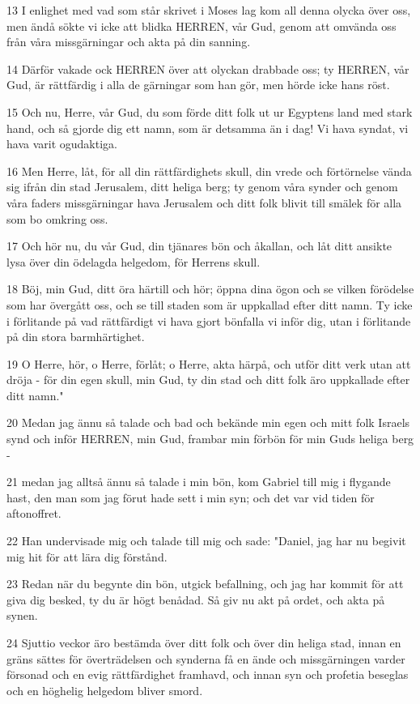 \par 13 I enlighet med vad som står skrivet i Moses lag kom all denna olycka över oss, men ändå sökte vi icke att blidka HERREN, vår Gud, genom att omvända oss från våra missgärningar och akta på din sanning.
\par 14 Därför vakade ock HERREN över att olyckan drabbade oss; ty HERREN, vår Gud, är rättfärdig i alla de gärningar som han gör, men hörde icke hans röst.
\par 15 Och nu, Herre, vår Gud, du som förde ditt folk ut ur Egyptens land med stark hand, och så gjorde dig ett namn, som är detsamma än i dag! Vi hava syndat, vi hava varit ogudaktiga.
\par 16 Men Herre, låt, för all din rättfärdighets skull, din vrede och förtörnelse vända sig ifrån din stad Jerusalem, ditt heliga berg; ty genom våra synder och genom våra faders missgärningar hava Jerusalem och ditt folk blivit till smälek för alla som bo omkring oss.
\par 17 Och hör nu, du vår Gud, din tjänares bön och åkallan, och låt ditt ansikte lysa över din ödelagda helgedom, för Herrens skull.
\par 18 Böj, min Gud, ditt öra härtill och hör; öppna dina ögon och se vilken förödelse som har övergått oss, och se till staden som är uppkallad efter ditt namn. Ty icke i förlitande på vad rättfärdigt vi hava gjort bönfalla vi inför dig, utan i förlitande på din stora barmhärtighet.
\par 19 O Herre, hör, o Herre, förlåt; o Herre, akta härpå, och utför ditt verk utan att dröja - för din egen skull, min Gud, ty din stad och ditt folk äro uppkallade efter ditt namn."
\par 20 Medan jag ännu så talade och bad och bekände min egen och mitt folk Israels synd och inför HERREN, min Gud, frambar min förbön för min Guds heliga berg -
\par 21 medan jag alltså ännu så talade i min bön, kom Gabriel till mig i flygande hast, den man som jag förut hade sett i min syn; och det var vid tiden för aftonoffret.
\par 22 Han undervisade mig och talade till mig och sade: "Daniel, jag har nu begivit mig hit för att lära dig förstånd.
\par 23 Redan när du begynte din bön, utgick befallning, och jag har kommit för att giva dig besked, ty du är högt benådad. Så giv nu akt på ordet, och akta på synen.
\par 24 Sjuttio veckor äro bestämda över ditt folk och över din heliga stad, innan en gräns sättes för överträdelsen och synderna få en ände och missgärningen varder försonad och en evig rättfärdighet framhavd, och innan syn och profetia beseglas och en höghelig helgedom bliver smord.
